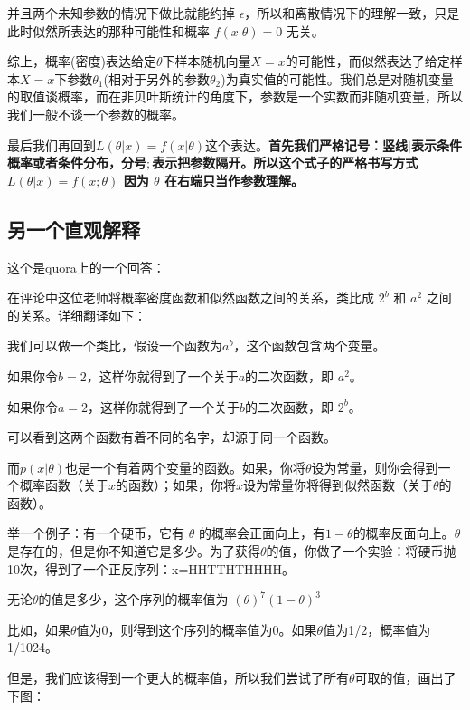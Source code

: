 \documentclass[12pt]{article}
\begin{document}
并且两个未知参数的情况下做比就能约掉 $\epsilon$，所以和离散情况下的理解一致，只是此时似然所表达的那种可能性和概率 $f(x|\theta) = 0$ 无关。

综上，概率(密度)表达给定$\theta$下样本随机向量$X=x$的可能性，而似然表达了给定样本$X=x$下参数$\theta_1$(相对于另外的参数$\theta_2$)为真实值的可能性。我们总是对随机变量的取值谈概率，而在非贝叶斯统计的角度下，参数是一个实数而非随机变量，所以我们一般不谈一个参数的概率。

最后我们再回到$L(\theta|x)=f(x|\theta)$这个表达。\textbf{首先我们严格记号：竖线$|$表示条件概率或者条件分布，分号$;$表示把参数隔开。所以这个式子的严格书写方式$L(\theta|x)=f(x;\theta)$ 因为 $\theta$ 在右端只当作参数理解。}

\subsection{另一个直观解释\cite{Zhihu-likelihood-2}}
这个是quora上的一个回答\cite{The_Difference_Between_Probability_And_Likelihood}：

在评论中这位老师将概率密度函数和似然函数之间的关系，类比成 $2^b$ 和 $a^2$ 之间的关系。详细翻译如下：

我们可以做一个类比，假设一个函数为$a^b$，这个函数包含两个变量。

如果你令$b=2$，这样你就得到了一个关于$a$的二次函数，即 $a^2$。

如果你令$a=2$，这样你就得到了一个关于$b$的二次函数，即 $2^b$。

可以看到这两个函数有着不同的名字，却源于同一个函数。

而$p(x|\theta)$也是一个有着两个变量的函数。如果，你将$\theta$设为常量，则你会得到一个概率函数（关于$x$的函数）；如果，你将$x$设为常量你将得到似然函数（关于$\theta$的函数）。

举一个例子：有一个硬币，它有 $\theta$ 的概率会正面向上，有$1 - \theta$的概率反面向上。$\theta$是存在的，但是你不知道它是多少。为了获得$\theta$的值，你做了一个实验：将硬币抛10次，得到了一个正反序列：x=HHTTHTHHHH。

无论$\theta$的值是多少，这个序列的概率值为 $(\theta)^7(1-\theta)^3$

比如，如果$\theta$值为0，则得到这个序列的概率值为0。如果$\theta$值为1/2，概率值为1/1024。

但是，我们应该得到一个更大的概率值，所以我们尝试了所有$\theta$可取的值，画出了下图：
\end{document}
